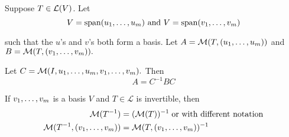   \setcounter{thm}{83}
  \begin{thm}
    Suppose $T \in \mathcal{L}(V)$. Let
    \begin{equation}
          V = \myspan{\onetillm{u}}
          $ and $V= \myspan{\onetillm{v}}
    \end{equation}

  such that the $u$'s and $v$'s both form a basis. Let $A=\mathcal{M}(T, (u_1, \dots, u_m))$ and $B=\mathcal{M}(T,(v_1, \dots, v_m)).$

   Let $C=\mathcal{M}(I, u_1, \dots, u_m, v_1, \dots, v_m).$ Then
    \begin{equation}
    A = C^{-1} B C
    \end{equation}
  \end{thm}

  \setcounter{thm}{85}
  \begin{thm}
    If $v_1, \dots, v_m$ is a basis $V$ and $T\in \mathcal{L}$ is invertible, then
    \begin{equation}
      \begin{aligned}
        \mathcal{M}(T^{-1}) & = (\mathcal{M}(T))^{-1} \; \text{or with different notation} \\
        \mathcal{M}(T^{-1}, (v_1, \dots, v_m)) & =\mathcal{M}(T, (v_1, \dots, v_m))^{-1}
      \end{aligned}
    \end{equation}
  \end{thm}